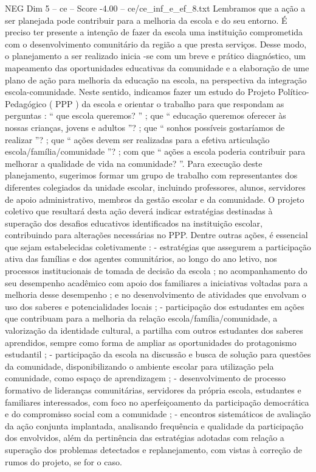 \begin{textsample}{NEG Dim 5 – ce – Score -4.00 – ce/ce\_inf\_e\_ef\_8.txt}
Lembramos que a ação a ser planejada pode contribuir para a melhoria da escola e do seu entorno.
É preciso ter presente a intenção de fazer da escola uma instituição comprometida com o desenvolvimento comunitário da região a que presta serviços.
Desse modo, o planejamento a ser realizado inicia -se com um breve e prático diagnóstico, um mapeamento das oportunidades educativas da comunidade e a elaboração de ume plano de ação para melhoria da educação na escola, na perspectiva da integração escola-comunidade.
Neste sentido, indicamos fazer um estudo do Projeto Político-Pedagógico ( PPP ) da escola e orientar o trabalho para que respondam as perguntas : “ que escola queremos? ” ; que “ educação queremos oferecer às nossas crianças, jovens e adultos ”? ; que “ sonhos possíveis gostaríamos de realizar ”? ; que “ ações devem ser realizadas para a efetiva articulação escola/família/comunidade ”? ; com que “ ações a escola poderia contribuir para melhorar a qualidade de vida na comunidade? ”.
Para execução deste planejamento, sugerimos formar um grupo de trabalho com representantes dos diferentes colegiados da unidade escolar, incluindo professores, alunos, servidores de apoio administrativo, membros da gestão escolar e da comunidade.
O projeto coletivo que resultará desta ação deverá indicar estratégias destinadas à superação dos desafios educativos identificados na instituição escolar, contribuindo para alterações necessárias no PPP.
Dentre outras ações, é essencial que sejam estabelecidas coletivamente : - estratégias que assegurem a participação ativa das famílias e dos agentes comunitários, ao longo do ano letivo, nos processos institucionais de tomada de decisão da escola ; no acompanhamento do seu desempenho acadêmico com apoio dos familiares a iniciativas voltadas para a melhoria desse desempenho ; e no desenvolvimento de atividades que envolvam o uso dos saberes e potencialidades locais ; - participação dos estudantes em ações que contribuam para a melhoria da relação escola/família/comunidade, a valorização da identidade cultural, a partilha com outros estudantes dos saberes aprendidos, sempre como forma de ampliar as oportunidades do protagonismo estudantil ; - participação da escola na discussão e busca de solução para questões da comunidade, disponibilizando o ambiente escolar para utilização pela comunidade, como espaço de aprendizagem ; - desenvolvimento de processo formativo de lideranças comunitárias, servidores da própria escola, estudantes e familiares interessados, com foco no aperfeiçoamento da participação democrática e do compromisso social com a comunidade ; - encontros sistemáticos de avaliação da ação conjunta implantada, analisando frequência e qualidade da participação dos envolvidos, além da pertinência das estratégias adotadas com relação a superação dos problemas detectados e replanejamento, com vistas à correção de rumos do projeto, se for o caso.

\end{textsample}

